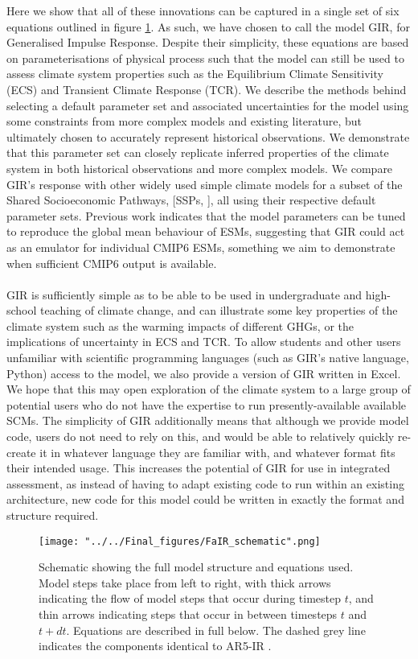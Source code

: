\documentclass[gmd, manuscript]{copernicus}
\begin{document}
Here we show that all of these innovations can be captured in a single set of six equations outlined in figure \ref{fig:schematic}. As such, we have chosen to call the model GIR, for Generalised Impulse Response. Despite their simplicity, these equations are based on parameterisations of physical process such that the model can still be used to assess climate system properties such as the Equilibrium Climate Sensitivity (ECS) and Transient Climate Response (TCR). We describe the methods behind selecting a default parameter set and associated uncertainties for the model using some constraints from more complex models and existing literature, but ultimately chosen to accurately represent historical observations. We demonstrate that this parameter set can closely replicate inferred properties of the climate system in both historical observations and more complex models. We compare GIR’s response with other widely used simple climate models for a subset of the Shared Socioeconomic Pathways, [SSPs, \cite{Riahi2017}], all using their respective default parameter sets. Previous work \citep{Joos2013,Tsutsui2017} indicates that the model parameters can be tuned to reproduce the global mean behaviour of ESMs, suggesting that GIR could act as an emulator for individual CMIP6 ESMs, something we aim to demonstrate when sufficient CMIP6 output is available.\\\\
GIR is sufficiently simple as to be able to be used in undergraduate and high-school teaching of climate change, and can illustrate some key properties of the climate system such as the warming impacts of different GHGs, or the implications of uncertainty in ECS and TCR. To allow students and other users unfamiliar with scientific programming languages (such as GIR's native language, Python) access to the model, we also provide a version of GIR written in Excel. We hope that this may open exploration of the climate system to a large group of potential users who do not have the expertise to run presently-available available SCMs. The simplicity of GIR additionally means that although we provide model code, users do not need to rely on this, and would be able to relatively quickly re-create it in whatever language they are familiar with, and whatever format fits their intended usage. This increases the potential of GIR for use in integrated assessment, as instead of having to adapt existing code to run within an existing architecture, new code for this model could be written in exactly the format and structure required.
\begin{figure}[t]
\texttt{[image: "../../Final\_figures/FaIR\_schematic".png]}
\caption{Schematic showing the full model structure and equations used. Model steps take place from left to right, with thick arrows indicating the flow of model steps that occur during timestep $t$, and thin arrows indicating steps that occur in between timesteps $t$ and $t+dt$. Equations are described in full below. The dashed grey line indicates the components identical to AR5-IR \citep{Myhre2013a}.}
\label{fig:schematic}
\end{figure}
\end{document}
